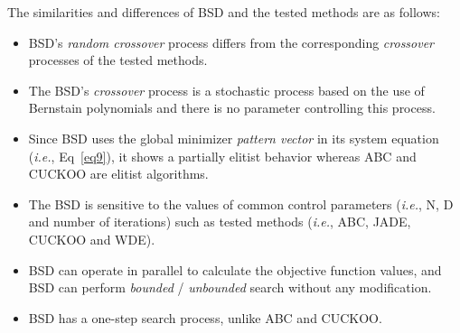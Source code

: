 \documentclass[preprint,10pt,3p]{elsarticle}
\begin{document}
The similarities and differences of \textcolor{bluebell}{BSD} and the tested methods are as follows:
\begin{itemize}
  \item \textcolor{bluebell}{BSD}'s \emph{random crossover} process differs from the corresponding \emph{crossover} processes of the tested methods.
  \item The \textcolor{bluebell}{BSD}'s \emph{crossover} process is a stochastic process based on the use of Bernstain polynomials and there is no parameter controlling this process.
  \item Since \textcolor{bluebell}{BSD} uses the global minimizer \emph{pattern vector} in its system equation (\emph{i.e.}, Eq~\ref{eq9}), it shows a partially elitist behavior whereas ABC and CUCKOO are elitist algorithms.
  \item The \textcolor{bluebell}{BSD} is sensitive to the values ​​of common control parameters (\emph{i.e.}, N, D and number of iterations)  such as tested methods (\emph{i.e.}, ABC, JADE, CUCKOO and WDE).
  \item \textcolor{bluebell}{BSD} can operate in parallel to calculate the objective function values, and \textcolor{bluebell}{BSD} can perform \emph{bounded} / \emph{unbounded} search without any modification.
  \item \textcolor{bluebell}{BSD} has a one-step search process, unlike ABC and CUCKOO.
\end{itemize}
\end{document}
